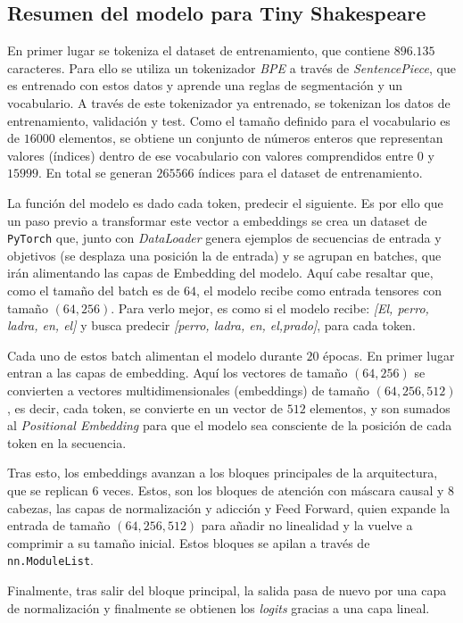 \documentclass[11pt]{book}
\begin{document}
\subsection{Resumen del modelo para Tiny Shakespeare}

En primer lugar se tokeniza el dataset de entrenamiento, que contiene $896.135$ caracteres. Para ello se utiliza un tokenizador \textit{BPE} a través de \textit{SentencePiece}, que es entrenado con estos datos y aprende una reglas de segmentación y un vocabulario. A través de este tokenizador ya entrenado, se tokenizan los datos de entrenamiento, validación y test. Como el tamaño definido para el vocabulario es de $16000$ elementos, se obtiene un conjunto de números enteros que representan valores (índices) dentro de ese vocabulario con valores comprendidos entre $0$ y $15999$. En total se generan $265566$ índices para el dataset de entrenamiento. 

La función del modelo es dado cada token, predecir el siguiente. Es por ello que un paso previo a transformar este vector a embeddings se crea un dataset de \texttt{PyTorch} que, junto con \textit{DataLoader} genera ejemplos de secuencias de entrada y objetivos (se desplaza una posición la de entrada) y se agrupan en batches, que irán alimentando las capas de Embedding del modelo. Aquí cabe resaltar que, como el tamaño del batch es de $64$, el modelo recibe como entrada tensores con tamaño $(64,256)$. Para verlo mejor, es como si el modelo recibe: \textit{[El, perro, ladra, en, el]} y busca predecir \textit{[perro, ladra, en, el,prado]}, para cada token.


Cada uno de estos batch alimentan el modelo durante $20$ épocas. En primer lugar entran a las capas de embedding. Aquí los vectores de tamaño $(64,256)$ se convierten a vectores multidimensionales (embeddings) de tamaño $(64,256, 512)$, es decir, cada token, se convierte en un vector de $512$ elementos, y son sumados al \textit{Positional Embedding} para que el modelo sea consciente de la posición de cada token en la secuencia. 

Tras esto, los embeddings avanzan a los bloques principales de la arquitectura, que se replican $6$ veces. Estos, son los bloques de atención con máscara causal y 8 cabezas, las capas de normalización y adicción y Feed Forward, quien expande la entrada de tamaño $(64,256, 512)$ para añadir no linealidad y la vuelve a comprimir a su tamaño inicial. Estos bloques se apilan a través de \texttt{nn.ModuleList}. 

Finalmente, tras salir del bloque principal, la salida pasa de nuevo por una capa de normalización y finalmente se obtienen los \textit{logits} gracias a una capa lineal. 
\end{document}
